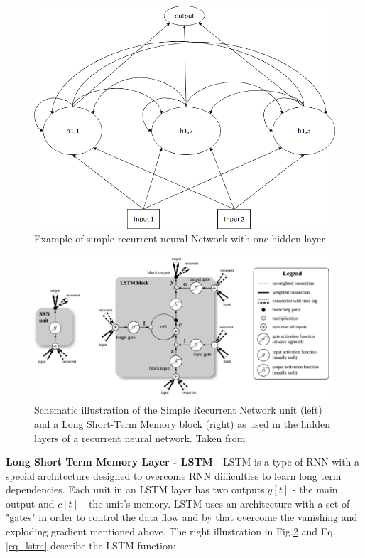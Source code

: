 \documentclass[
12pt, %
english, %
doublespacing, %
headsepline, %
]{MastersDoctoralThesis} %
\begin{document}
\begin{figure}
	\centering
	\includegraphics[width=0.7\linewidth]{Figures/RNN_Example}
	\caption{Example of simple recurrent neural Network with one hidden layer}
	\label{fig:RNN_Example}
\end{figure}

\begin{figure}
	\centering
	\includegraphics[width=1.0\linewidth]{LSTM_RNN_placeholder_clear.png}
	\caption{Schematic illustration of the Simple Recurrent Network unit (left) and a Long Short-Term Memory block (right) as used
		in the hidden layers of a recurrent neural network. Taken from \cite{ greff2017lstm}}	
	
	\label{fig:LSTM_arch}
\end{figure}
\textbf{Long Short Term Memory Layer - LSTM} - LSTM is a type of RNN with a special architecture designed to overcome RNN difficulties to learn long term dependencies. Each unit in an LSTM layer has two outputs:$y[t]$ - the main output and $c[t]$ - the unit's memory. LSTM uses an architecture with a set of "gates" in order to control the data flow and by that overcome the vanishing and exploding gradient mentioned above. The right illustration in Fig.\ref{fig:LSTM_arch} and Eq.\ref{eq_lstm} describe the LSTM function:
\end{document}
